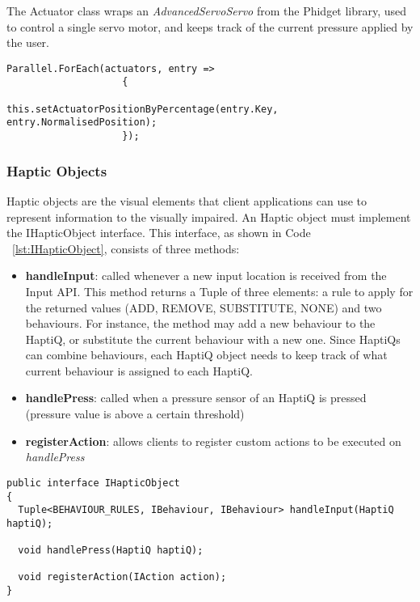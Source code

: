 The Actuator class wraps an \textit{AdvancedServoServo} from the Phidget library, used to control a single servo motor, and keeps track of the current pressure applied by the user. 

\lstset{style=sharpc1}
\begin{lstlisting}[caption={Parallelising Actuators},label={lst:parallelActuators}]
Parallel.ForEach(actuators, entry => 
                    {
                        this.setActuatorPositionByPercentage(entry.Key, entry.NormalisedPosition);
                    });
\end{lstlisting}

\subsubsection{Haptic Objects}

Haptic objects are the visual elements that client applications can use to represent information to the visually impaired. An Haptic object must implement the IHapticObject interface. This interface, as shown in Code ~\ref{lst:IHapticObject}, consists of three methods:

\begin{itemize}
	\item \textbf{handleInput}: called whenever a new input location is received from the Input API. This method returns a Tuple of three elements: a rule to apply for the returned values (ADD, REMOVE, SUBSTITUTE, NONE) and two behaviours. For instance, the method may add a new behaviour to the HaptiQ, or substitute the current behaviour with a new one. Since HaptiQs can combine behaviours, each HaptiQ object needs to keep track of what current behaviour is assigned to each HaptiQ. 
    \item \textbf{handlePress}: called when a pressure sensor of an HaptiQ is pressed (pressure value is above a certain threshold)
    \item \textbf{registerAction}: allows clients to register custom actions to be executed on \textit{handlePress}
\end{itemize}

\lstset{style=sharpc1}
\begin{lstlisting}[caption={IHapticObject},label={lst:IHapticObject}]
public interface IHapticObject 
{
  Tuple<BEHAVIOUR_RULES, IBehaviour, IBehaviour> handleInput(HaptiQ haptiQ);
  
  void handlePress(HaptiQ haptiQ);
  
  void registerAction(IAction action);
}
\end{lstlisting}

